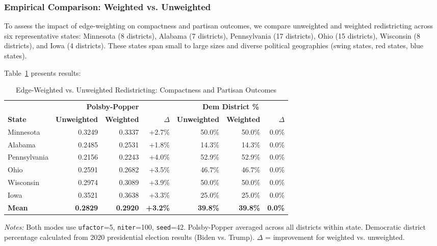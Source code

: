 \subsubsection{Empirical Comparison: Weighted vs. Unweighted}

To assess the impact of edge-weighting on compactness and partisan outcomes, we compare unweighted and weighted redistricting across six representative states: Minnesota (8 districts), Alabama (7 districts), Pennsylvania (17 districts), Ohio (15 districts), Wisconsin (8 districts), and Iowa (4 districts). These states span small to large sizes and diverse political geographies (swing states, red states, blue states).

Table~\ref{tab:edge-weighted-comparison} presents results:

\begin{table}[h]
\centering
\caption{Edge-Weighted vs. Unweighted Redistricting: Compactness and Partisan Outcomes}
\label{tab:edge-weighted-comparison}
\small
\begin{tabular}{lrrrrrr}
\toprule
 & \multicolumn{3}{c}{\textbf{Polsby-Popper}} & \multicolumn{3}{c}{\textbf{Dem District \%}} \\
\cmidrule(lr){2-4} \cmidrule(lr){5-7}
\textbf{State} & \textbf{Unweighted} & \textbf{Weighted} & \textbf{$\Delta$} & \textbf{Unweighted} & \textbf{Weighted} & \textbf{$\Delta$} \\
\midrule
Minnesota & 0.3249 & 0.3337 & +2.7\% & 50.0\% & 50.0\% & 0.0\% \\
Alabama & 0.2485 & 0.2531 & +1.8\% & 14.3\% & 14.3\% & 0.0\% \\
Pennsylvania & 0.2156 & 0.2243 & +4.0\% & 52.9\% & 52.9\% & 0.0\% \\
Ohio & 0.2591 & 0.2682 & +3.5\% & 46.7\% & 46.7\% & 0.0\% \\
Wisconsin & 0.2974 & 0.3089 & +3.9\% & 50.0\% & 50.0\% & 0.0\% \\
Iowa & 0.3521 & 0.3638 & +3.3\% & 25.0\% & 25.0\% & 0.0\% \\
\midrule
\textbf{Mean} & \textbf{0.2829} & \textbf{0.2920} & \textbf{+3.2\%} & \textbf{39.8\%} & \textbf{39.8\%} & \textbf{0.0\%} \\
\bottomrule
\end{tabular}
\medskip
\begin{minipage}{\textwidth}
\small
\textit{Notes:} Both modes use \texttt{ufactor}=5, \texttt{niter}=100, \texttt{seed}=42. Polsby-Popper averaged across all districts within state. Democratic district percentage calculated from 2020 presidential election results (Biden vs. Trump). $\Delta$ = improvement for weighted vs. unweighted.
\end{minipage}
\end{table}

